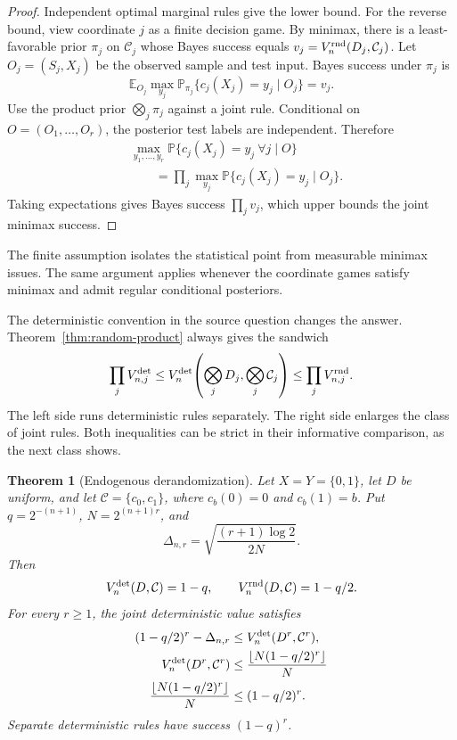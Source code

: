 \documentclass[twoside]{article}
\newtheorem{theorem}{Theorem}
\newcommand{\E}{\mathbb E}
\newcommand{\Prb}{\mathbb P}
\newcommand{\cC}{\mathcal C}
\begin{document}
\begin{proof}
Independent optimal marginal rules give the lower bound. For the reverse bound, view coordinate $j$ as a finite decision game. By minimax, there is a least-favorable prior $\pi_j$ on $\cC_j$ whose Bayes success equals $v_j=V_n^{\rm rnd}(D_j,\cC_j)$. Let $O_j=(S_j,X_j)$ be the observed sample and test input. Bayes success under $\pi_j$ is \[ \E_{O_j}\max_{y_j}\Prb_{\pi_j}\{c_j(X_j)=y_j\mid O_j\}=v_j. \] Use the product prior $\bigotimes_j\pi_j$ against a joint rule. Conditional on $O=(O_1,\ldots,O_r)$, the posterior test labels are independent. Therefore \[
\begin{aligned}
&\max_{y_1,\ldots,y_r}\Prb\{c_j(X_j)=y_j\ \forall j\mid O\}\\
&\qquad=\prod_j\max_{y_j}\Prb\{c_j(X_j)=y_j\mid O_j\}.
\end{aligned}
\] Taking expectations gives Bayes success $\prod_jv_j$, which upper bounds the joint minimax success.
\end{proof}

The finite assumption isolates the statistical point from measurable minimax issues. The same argument applies whenever the coordinate games satisfy minimax and admit regular conditional posteriors.

The deterministic convention in the source question changes the answer. Theorem~\ref{thm:random-product} always gives the sandwich
\begin{equation}
\prod_jV_{n,j}^{\rm det}\leq V_n^{\rm det}\!\left(\bigotimes_jD_j,\bigotimes_j\cC_j\right)\leq\prod_jV_{n,j}^{\rm rnd}.
\label{eq:sandwich}
\end{equation}
The left side runs deterministic rules separately. The right side enlarges the class of joint rules. Both inequalities can be strict in their informative comparison, as the next class shows.

\begin{theorem}[Endogenous derandomization]\label{thm:det-product}
Let $X=Y=\{0,1\}$, let $D$ be uniform, and let $\cC=\{c_0,c_1\}$, where $c_b(0)=0$ and $c_b(1)=b$. Put $q=2^{-(n+1)}$, $N=2^{(n+1)r}$, and \[ \Delta_{n,r}=\sqrt{\frac{(r+1)\log 2}{2N}}. \] Then \[ V_n^{\rm det}(D,\cC)=1-q,\qquad V_n^{\rm rnd}(D,\cC)=1-q/2. \] For every $r\geq1$, the joint deterministic value satisfies
\begin{equation}
\begin{aligned}
(1-q/2)^r-\Delta_{n,r}&\leq V_n^{\rm det}(D^r,\cC^r),\\
V_n^{\rm det}(D^r,\cC^r)&\leq\frac{\lfloor N(1-q/2)^r\rfloor}{N}
\\
\frac{\lfloor N(1-q/2)^r\rfloor}{N}&\leq(1-q/2)^r.
\end{aligned}
\label{eq:det-bound}
\end{equation}
Separate deterministic rules have success $(1-q)^r$.
\end{theorem}
\end{document}

